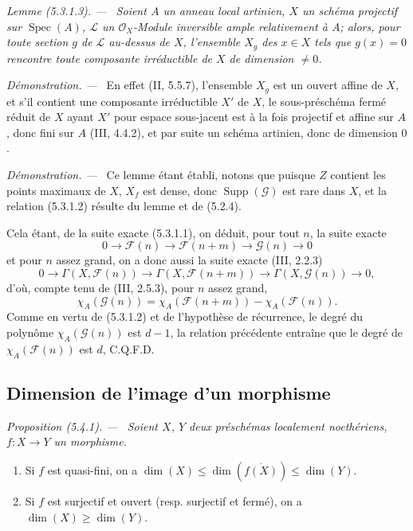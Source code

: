 \documentclass[10pt,oneside]{book}
\newcommand{\oldpage}[2][]{%
  \setcounter{footnote}{0}%
  \marginpar{\scriptsize\textbf{#1}~|~#2}\ignorespaces}
\newenvironment{proposition}[1][]{%
  \par\medskip\noindent\itshape Proposition (#1). ---\ }{\par}
\newenvironment{lemma}[1][]{%
  \par\medskip\noindent\itshape Lemme (#1). ---\ }{\par}
\newenvironment{proof}{%
  \par\medskip\noindent\textit{Démonstration. ---\ }}{\par}
\begin{document}
\begin{lemma}[5.3.1.3]
\label{IV.2.s5.3.1.3-fr}
Soient $A$ un anneau local artinien, $X$ un schéma projectif sur
$\operatorname{Spec}(A)$, $\mathcal L$ un $\mathcal O_X$-Module inversible
ample relativement à $A$; alors, pour toute section $g$ de $\mathcal L$
au-dessus de $X$, l'ensemble $X_g$ des $x\in X$ tels que $g(x)=0$ rencontre
toute composante irréductible de $X$ de dimension $\ne0$.
\end{lemma}

\begin{proof}
En effet (II, 5.5.7), l'ensemble $X_g$ est un ouvert affine de $X$, et s'il
contient une composante irréductible $X'$ de $X$, le sous-préschéma fermé
réduit de $X$ ayant $X'$ pour espace sous-jacent est à la fois projectif et
affine sur $A$, donc fini sur $A$ (III, 4.4.2), et par suite un schéma
artinien, donc de dimension $0$.
\end{proof}

\begin{proof}
Ce lemme étant établi, notons que puisque $Z$ contient les points maximaux de
$X$, $X_f$ est dense, donc $\operatorname{Supp}(\mathcal G)$ est rare dans
$X$, et la relation (5.3.1.2) résulte du lemme et de (5.2.4).

\oldpage[IV-2]{93}

Cela étant, de la suite exacte (5.3.1.1), on déduit, pour tout $n$, la suite
exacte
\[
0\longrightarrow\mathcal F(n)\longrightarrow\mathcal F(n+m)
\longrightarrow\mathcal G(n)\longrightarrow0
\]
et pour $n$ assez grand, on a donc aussi la suite exacte (III, 2.2.3)
\[
0\longrightarrow\Gamma(X,\mathcal F(n))
\longrightarrow\Gamma(X,\mathcal F(n+m))
\longrightarrow\Gamma(X,\mathcal G(n))\longrightarrow0,
\]
d'où, compte tenu de (III, 2.5.3), pour $n$ assez grand,
\[
\chi_A(\mathcal G(n))
=\chi_A(\mathcal F(n+m))-\chi_A(\mathcal F(n)).
\]
Comme en vertu de (5.3.1.2) et de l'hypothèse de récurrence, le degré du
polynôme $\chi_A(\mathcal G(n))$ est $d-1$, la relation précédente entraîne
que le degré de $\chi_A(\mathcal F(n))$ est $d$, C.Q.F.D.
\end{proof}

\subsection{Dimension de l'image d'un morphisme}
\label{IV.2.s5.4-fr}

\begin{proposition}[5.4.1]
\label{IV.2.s5.4.1-fr}
Soient $X$, $Y$ deux préschémas localement noethériens, $f:X\to Y$ un
morphisme.
\begin{enumerate}
\item[(i)] Si $f$ est quasi-fini, on a
$\dim(X)\leq\dim(\overline{f(X)})\leq\dim(Y)$.
\item[(ii)] Si $f$ est surjectif et ouvert (resp. surjectif et fermé), on a
$\dim(X)\geq\dim(Y)$.
\end{enumerate}
\end{proposition}
\end{document}
